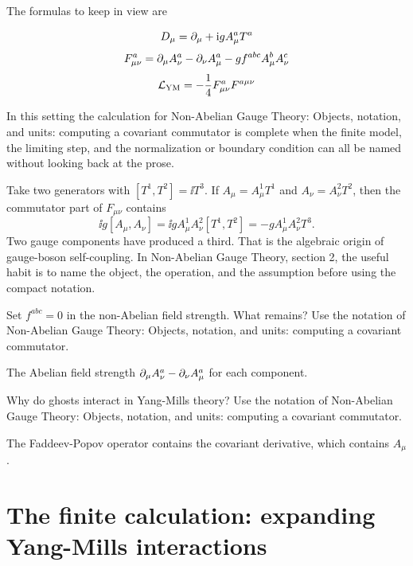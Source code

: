 The formulas to keep in view are

\[
  D_\mu=\partial_\mu+\mathrm i gA_\mu^aT^a
\]
\[
  F_{\mu\nu}^a=\partial_\mu A_\nu^a-\partial_\nu A_\mu^a-gf^{abc}A_\mu^bA_\nu^c
\]
\[
  \mathcal L_{\mathrm{YM}}=-\frac14F_{\mu\nu}^aF^{a\mu\nu}
\]

In this setting the calculation for Non-Abelian Gauge Theory: Objects, notation, and units: computing a covariant commutator is complete when the finite model, the limiting step, and the normalization or boundary condition can all be named without looking back at the prose.




\begin{example}
Take two generators with \([T^1,T^2]=\ii T^3\).  If \(A_\mu=A_\mu^1T^1\) and \(A_\nu=A_\nu^2T^2\), then the commutator part of \(F_{\mu\nu}\) contains
\[
  \ii g[A_\mu,A_\nu]=\ii gA_\mu^1A_\nu^2[T^1,T^2]=-gA_\mu^1A_\nu^2T^3.
\]
Two gauge components have produced a third.  That is the algebraic origin of gauge-boson self-coupling.  In Non-Abelian Gauge Theory, section 2, the useful habit is to name the object, the operation, and the assumption before using the compact notation.
\end{example}



\begin{exercise}
Set \(f^{abc}=0\) in the non-Abelian field strength.  What remains?  Use the notation of Non-Abelian Gauge Theory: Objects, notation, and units: computing a covariant commutator.
\begin{answer}
The Abelian field strength \(\partial_\mu A_\nu^a-\partial_\nu A_\mu^a\) for each component.
\end{answer}
\end{exercise}

\begin{exercise}
Why do ghosts interact in Yang-Mills theory?  Use the notation of Non-Abelian Gauge Theory: Objects, notation, and units: computing a covariant commutator.
\begin{answer}
The Faddeev-Popov operator contains the covariant derivative, which contains \(A_\mu\).
\end{answer}
\end{exercise}



\section{The finite calculation: expanding Yang-Mills interactions}

